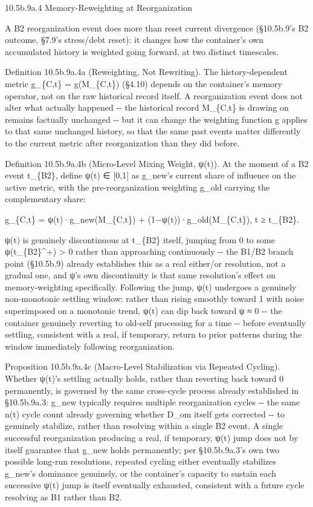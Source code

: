 \documentclass[
]{article}
\begin{document}
10.5b.9a.4 Memory-Reweighting at Reorganization

A B2 reorganization event does more than reset current divergence
(§10.5b.9's B2 outcome, §7.9's stress/debt reset): it changes how the
container's own accumulated history is weighted going forward, at two
distinct timescales.

Definition 10.5b.9a.4a (Reweighting, Not Rewriting). The
history-dependent metric g\_\{C,t\} = g(M\_\{C,t\}) (§4.10) depends on
the container's memory operator, not on the raw historical record
itself. A reorganization event does not alter what actually happened
-\/- the historical record M\_\{C,t\} is drawing on remains factually
unchanged -\/- but it can change the weighting function g applies to
that same unchanged history, so that the same past events matter
differently to the current metric after reorganization than they did
before.

Definition 10.5b.9a.4b (Micro-Level Mixing Weight, ψ(t)). At the moment
of a B2 event t\_\{B2\}, define ψ(t) ∈ {[}0,1{]} as g\_new's current
share of influence on the active metric, with the pre-reorganization
weighting g\_old carrying the complementary share:

g\_\{C,t\} = ψ(t)·g\_new(M\_\{C,t\}) + (1−ψ(t))·g\_old(M\_\{C,t\}), t ≥
t\_\{B2\}.

ψ(t) is genuinely discontinuous at t\_\{B2\} itself, jumping from 0 to
some ψ(t\_\{B2\}\^{}+) \textgreater{} 0 rather than approaching
continuously -\/- the B1/B2 branch point (§10.5b.9) already establishes
this as a real either/or resolution, not a gradual one, and ψ's own
discontinuity is that same resolution's effect on memory-weighting
specifically. Following the jump, ψ(t) undergoes a genuinely
non-monotonic settling window: rather than rising smoothly toward 1 with
noise superimposed on a monotonic trend, ψ(t) can dip back toward ψ ≈ 0
-\/- the container genuinely reverting to old-self processing for a time
-\/- before eventually settling, consistent with a real, if temporary,
return to prior patterns during the window immediately following
reorganization.

Proposition 10.5b.9a.4c (Macro-Level Stabilization via Repeated
Cycling). Whether ψ(t)'s settling actually holds, rather than reverting
back toward 0 permanently, is governed by the same cross-cycle process
already established in §10.5b.9a.3: g\_new typically requires multiple
reorganization cycles -\/- the same n(t) cycle count already governing
whether D\_om itself gets corrected -\/- to genuinely stabilize, rather
than resolving within a single B2 event. A single successful
reorganization producing a real, if temporary, ψ(t) jump does not by
itself guarantee that g\_new holds permanently; per §10.5b.9a.3's own
two possible long-run resolutions, repeated cycling either eventually
stabilizes g\_new's dominance genuinely, or the container's capacity to
sustain each successive ψ(t) jump is itself eventually exhausted,
consistent with a future cycle resolving as B1 rather than B2.
\end{document}

